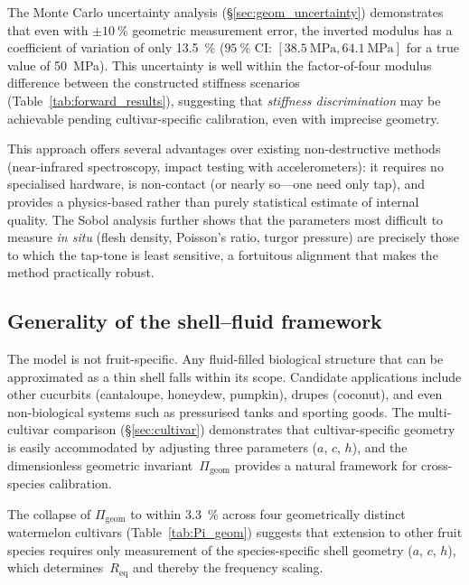 The Monte Carlo uncertainty analysis (\S\ref{sec:geom_uncertainty})
demonstrates that even with $\pm\SI{10}{\percent}$ geometric
measurement error, the inverted modulus has a coefficient of variation
of only \SI{13.5}{\percent} ($\SI{95}{\percent}$ CI:
$[\SI{38.5}{\mega\pascal}, \SI{64.1}{\mega\pascal}]$ for a true value
of \SI{50}{\mega\pascal}).  This uncertainty is well within the
factor-of-four modulus difference between the constructed stiffness scenarios
(Table~\ref{tab:forward_results}), suggesting that
\emph{stiffness discrimination} may be achievable pending
cultivar-specific calibration, even with imprecise geometry.

This approach offers several advantages over existing non-destructive
methods (near-infrared spectroscopy, impact testing with accelerometers):
it requires no specialised hardware, is non-contact (or nearly so---one
need only tap), and provides a physics-based rather than purely
statistical estimate of internal quality.  The Sobol analysis further
shows that the parameters most difficult to measure \emph{in situ}
(flesh density, Poisson's ratio, turgor pressure) are precisely those
to which the tap-tone is least sensitive, a fortuitous alignment that
makes the method practically robust.

\subsection{Generality of the shell--fluid framework}
\label{sec:generality}

The model is not fruit-specific.  Any fluid-filled biological structure
that can be approximated as a thin shell falls within its
scope.  Candidate applications include other cucurbits (cantaloupe,
honeydew, pumpkin), drupes (coconut), and even non-biological systems
such as pressurised tanks and sporting goods.  The multi-cultivar
comparison (\S\ref{sec:cultivar}) demonstrates that cultivar-specific
geometry is easily accommodated by adjusting three parameters ($a$, $c$,
$h$), and the dimensionless geometric invariant~$\Pi_{\mathrm{geom}}$
provides a natural framework for cross-species calibration.

The collapse of $\Pi_{\mathrm{geom}}$ to within
\SI{3.3}{\percent} across four geometrically distinct watermelon
cultivars (Table~\ref{tab:Pi_geom}) suggests that extension to other
fruit species requires only measurement of the species-specific
shell geometry ($a$, $c$, $h$), which determines~$R_{\mathrm{eq}}$
and thereby the frequency scaling.

